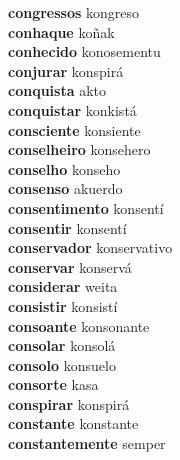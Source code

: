 \textbf{congressos } kongreso \\
\textbf{conhaque } koñak \\
\textbf{conhecido } konosementu \\
\textbf{conjurar } konspirá \\
\textbf{conquista } akto \\
\textbf{conquistar } konkistá \\
\textbf{consciente } konsiente \\
\textbf{conselheiro } konsehero \\
\textbf{conselho } konseho \\
\textbf{consenso } akuerdo \\
\textbf{consentimento } konsentí \\
\textbf{consentir } konsentí \\
\textbf{conservador } konservativo \\
\textbf{conservar } konservá \\
\textbf{considerar } weita \\
\textbf{consistir } konsistí \\
\textbf{consoante } konsonante \\
\textbf{consolar } konsolá \\
\textbf{consolo } konsuelo \\
\textbf{consorte } kasa \\
\textbf{conspirar } konspirá \\
\textbf{constante } konstante \\
\textbf{constantemente } semper \\
